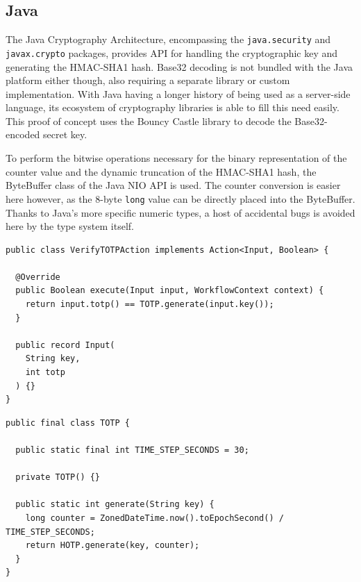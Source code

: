 \subsection{Java}
The Java Cryptography Architecture, encompassing the \texttt{java.security} and \texttt{javax.crypto} packages, provides API for handling the cryptographic key and generating the HMAC-SHA1 hash. Base32 decoding is not bundled with the Java platform either though, also requiring a separate library or custom implementation. With Java having a longer history of being used as a server-side language, its ecosystem of cryptography libraries is able to fill this need easily. This proof of concept uses the Bouncy Castle library to decode the Base32-encoded secret key. 

To perform the bitwise operations necessary for the binary representation of the counter value and the dynamic truncation of the HMAC-SHA1 hash, the ByteBuffer class of the Java NIO API is used. The counter conversion is easier here however, as the 8-byte \texttt{long} value can be directly placed into the ByteBuffer. Thanks to Java's more specific numeric types, a host of accidental bugs is avoided here by the type system itself.
\begin{listing}[H]
    \begin{verbatim}
public class VerifyTOTPAction implements Action<Input, Boolean> {
    
  @Override
  public Boolean execute(Input input, WorkflowContext context) {
    return input.totp() == TOTP.generate(input.key());
  }
    
  public record Input(
    String key,
    int totp
  ) {}
}
    \end{verbatim}
    \caption{TOTP verification Action in Java}
\end{listing}
\begin{listing}[H]
    \begin{verbatim}
public final class TOTP {
    
  public static final int TIME_STEP_SECONDS = 30;
    
  private TOTP() {}
    
  public static int generate(String key) {
    long counter = ZonedDateTime.now().toEpochSecond() / TIME_STEP_SECONDS;
    return HOTP.generate(key, counter);
  }
}
    \end{verbatim}
    \caption{TOTP generator in Java}
\end{listing}

